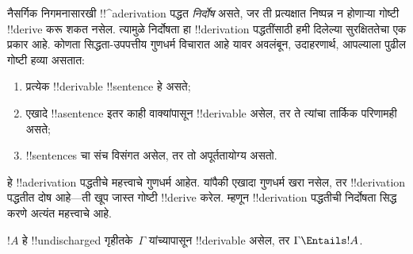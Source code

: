 \documentclass[../../../include/open-logic-section]{subfiles}
\begin{document}
      {}
      {}


\begin{explain}
नैसर्गिक निगमनासारखी !!^a{derivation} पद्धत \emph{निर्दोष} असते, जर ती
प्रत्यक्षात निष्पन्न न होणाऱ्या गोष्टी !!{derive} करू शकत नसेल. त्यामुळे
निर्दोषता हा !!{derivation} पद्धतींसाठी हमी दिलेल्या सुरक्षिततेचा एक प्रकार
आहे. कोणता सिद्धता-उपपत्तीय गुणधर्म विचारात आहे यावर अवलंबून, उदाहरणार्थ,
आपल्याला पुढील गोष्टी हव्या असतात:
\begin{enumerate}
\item प्रत्येक !!{derivable} !!{sentence} हे  असते;
\item एखादे !!a{sentence} इतर काही वाक्यांपासून !!{derivable} असेल, तर ते
  त्यांचा तार्किक परिणामही असते;
\item !!{sentence}s चा संच विसंगत असेल, तर तो अपूर्ततायोग्य असतो.
\end{enumerate}
हे !!a{derivation} पद्धतीचे महत्त्वाचे गुणधर्म आहेत. यांपैकी एखादा गुणधर्म
खरा नसेल, तर !!{derivation} पद्धतीत दोष आहे---ती खूप जास्त गोष्टी
!!{derive} करेल. म्हणून !!{derivation} पद्धतीची निर्दोषता सिद्ध करणे अत्यंत
महत्त्वाचे आहे.
\end{explain}

\begin{thm}[निर्दोषता]
$!A$ हे !!{undischarged} गृहीतके~$\Gamma$ यांच्यापासून !!{derivable} असेल, तर
$\Gamma \Entails !A$.
\end{thm}
\end{document}
